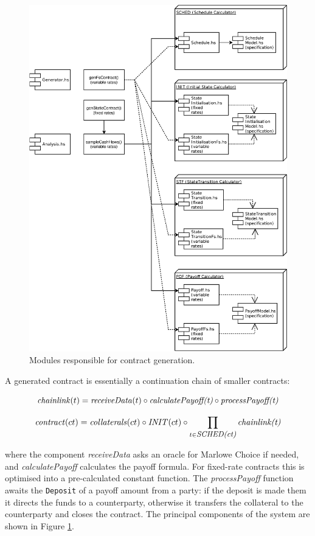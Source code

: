 \documentclass[runningheads]{llncs}
\newcommand{\ident}[1]{\mbox{\emph{#1}}}
\begin{document}
\begin{figure}
\includegraphics[width=1\textwidth]{images/modules} \caption{Modules responsible for contract generation.}
\label{fig1} 
\end{figure}

A generated contract is essentially a continuation chain of smaller contracts:

\noindent 
\begin{equation}
\ident{chainlink}(t)=\ident{receiveData}(t)\circ \ident{calculatePayoff(t)}\circ \ident{processPayoff(t)}
\end{equation}

\noindent 
\begin{equation}
\ident{contract}(ct)=\ident{collaterals}(ct)\circ \ident{INIT}(ct)\circ\prod_{\footnotesize t\in \ident{SCHED(ct)}}\ident{chainlink(t)}
\end{equation}

\noindent
where the component \emph{receiveData} asks an oracle for Marlowe Choice if needed, and
\mbox{\emph{calculatePayoff}} calculates the payoff formula. For fixed-rate contracts
this is optimised into a pre-calculated constant function. The \emph{processPayoff} function
awaits the \texttt{Deposit} of a payoff amount from a party: if the deposit is made them 
it directs the funds to a counterparty, otherwise it transfers
the collateral to the counterparty and closes the contract. The principal components of the system are shown in Figure \ref{fig1}.
\end{document}
